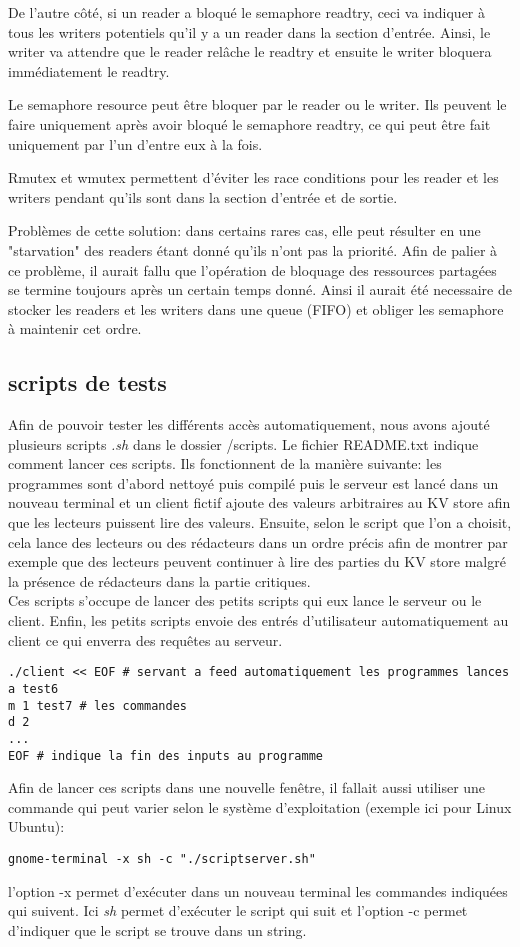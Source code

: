 \documentclass[11pt,a4paper]{article}
\begin{document}
De l'autre côté, si un reader a bloqué le semaphore readtry, ceci va indiquer à tous les writers potentiels qu'il y a un reader dans la section d'entrée. Ainsi, le writer va attendre que le reader relâche le readtry et ensuite le writer bloquera immédiatement le readtry.

Le semaphore resource peut être bloquer par le reader ou le writer. Ils peuvent le faire uniquement après avoir bloqué le semaphore readtry, ce qui peut être fait uniquement par l'un d'entre eux à la fois.

Rmutex et wmutex permettent d'éviter les race conditions pour les reader et les writers pendant qu'ils sont dans la section d'entrée et de sortie.

Problèmes de cette solution: dans certains rares cas, elle peut résulter en une "starvation" des readers étant donné qu'ils n'ont pas la priorité. Afin de palier à ce problème, il aurait fallu que l'opération de bloquage des ressources partagées se termine toujours après un certain temps donné. Ainsi il aurait été necessaire de stocker les readers et les writers dans une queue (FIFO) et obliger les semaphore à maintenir cet ordre.

\subsection{scripts de tests}
Afin de pouvoir tester les différents accès automatiquement, nous avons ajouté plusieurs scripts \textit{.sh} dans le dossier /scripts. Le fichier README.txt indique comment lancer ces scripts. Ils fonctionnent de la manière suivante: les programmes sont d'abord nettoyé puis compilé puis le serveur est lancé dans un nouveau terminal et un client fictif ajoute des valeurs arbitraires au KV store afin que les lecteurs puissent lire des valeurs. Ensuite, selon le script que l'on a choisit, cela lance des lecteurs ou des rédacteurs dans un ordre précis afin de montrer par exemple que des lecteurs peuvent continuer à lire des parties du KV store malgré la présence de rédacteurs dans la partie critiques. \\
Ces scripts s'occupe de lancer des petits scripts qui eux lance le serveur ou le client. Enfin, les petits scripts envoie des entrés d'utilisateur automatiquement au client ce qui enverra des requêtes au serveur. 
\begin{lstlisting}
./client << EOF # servant a feed automatiquement les programmes lances
a test6
m 1 test7 # les commandes 
d 2
...
EOF # indique la fin des inputs au programme
\end{lstlisting}
Afin de lancer ces scripts dans une nouvelle fenêtre, il fallait aussi utiliser une commande qui peut varier selon le système d'exploitation (exemple ici pour Linux Ubuntu):
\begin{lstlisting}
gnome-terminal -x sh -c "./scriptserver.sh" 
\end{lstlisting}
l'option -x permet d'exécuter dans un nouveau terminal les commandes indiquées qui suivent. Ici \textit{sh} permet d'exécuter le script qui suit et l'option -c permet d'indiquer que le script se trouve dans un string.
\end{document}

